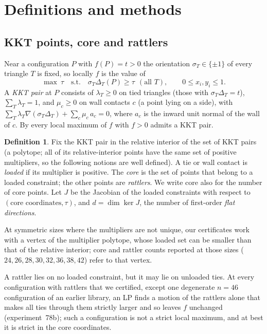 \documentclass[11pt]{amsart}
\theoremstyle{definition}
\newtheorem{definition}[theorem]{Definition}
\newcommand{\core}{\mathrm{core}}
\begin{document}
\section{Definitions and methods}\label{sec:methods}

\subsection{KKT points, core and rattlers}
Near a configuration $P$ with $f(P) = t > 0$ the orientation $\sigma_T \in \{\pm1\}$ of every triangle $T$ is fixed, so locally $f$ is the value of
\begin{equation}\label{eq:nlp}
  \max\ \tau \quad\text{s.t.}\quad \sigma_T \Delta_T(P) \ge \tau \ \ (\text{all } T), \qquad 0 \le x_i, y_i \le 1 .
\end{equation}
A \emph{KKT pair} at $P$ consists of $\lambda_T \ge 0$ on tied triangles (those with $\sigma_T\Delta_T = t$), $\sum_T \lambda_T = 1$, and $\mu_c \ge 0$ on wall contacts $c$ (a point lying on a side), with $\sum_T \lambda_T \nabla(\sigma_T\Delta_T) + \sum_c \mu_c\, a_c = 0$, where $a_c$ is the inward unit normal of the wall of $c$. By \cite{Trela} every local maximum of $f$ with $f > 0$ admits a KKT pair. %

\begin{definition}
Fix the KKT pair in the relative interior of the set of KKT pairs (a polytope; all of its relative-interior points have the same set of positive multipliers, so the following notions are well defined). A tie or wall contact is \emph{loaded} if its multiplier is positive. The \emph{core} is the set of points that belong to a loaded constraint; the other points are \emph{rattlers}. We write $\core$ also for the number of core points. Let $J$ be the Jacobian of the loaded constraints with respect to $(\text{core coordinates}, \tau)$, and $d = \dim\ker J$, the number of first-order \emph{flat directions}.
\end{definition}

At symmetric sizes where the multipliers are not unique, our certificates work with a vertex of the multiplier polytope, whose loaded set can be smaller than that of the relative interior; core and rattler counts reported at those sizes ($24, 26, 28, 30, 32, 36, 38, 42$) refer to that vertex.

A rattler lies on no loaded constraint, but it may lie on unloaded ties. At every configuration with rattlers that we certified, except one degenerate $n = 46$ configuration of an earlier library, an LP finds a motion of the rattlers alone that makes all ties through them strictly larger and so leaves $f$ unchanged (experiment~78b); such a configuration is not a strict local maximum, and at best it is strict in the core coordinates. %
\end{document}

